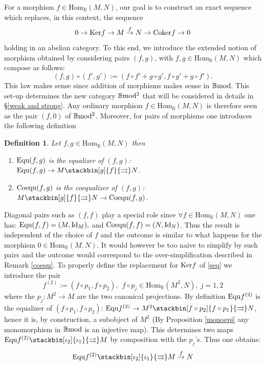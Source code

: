 \documentclass[12pt]{article}
\newtheorem{defn}[thm]{Definition}
\def\Hom{{\rm Hom}}
\def\id{{\rm id}}
\def\Ker{{\rm Ker}}
\def\equ{{\rm Equ}}
\def\coker{{\rm Coker}}
\def\coequ{{\rm Coequ}}
\def\B{{\mathbb B}}
\def\id{{\mbox{Id}}}
\def\Hom {{\mbox{Hom}}}
\def\bmod{{\rm \B mod}}
\def\bm2{{\rm \B mod^2}}
\begin{document}
For a morphism $f\in \Hom_\B(M,N)$, our goal is to construct an exact sequence which replaces, in this context, the sequence 
\begin{equation}\label{seq}
0\to \Ker f\to M\stackrel{f}{\to} N\to \coker f\to 0
\end{equation}
holding in an abelian category. To this end, we introduce the extended notion of morphism obtained by considering pairs $(f,g)$, with $f,g\in \Hom_\B(M,N)$ which compose 
as follows:
\begin{equation}\label{paircomp}
	(f,g)\circ (f',g'):=(f\circ f'+g\circ g', f\circ g'+g\circ f').
\end{equation}
This law makes sense since addition of morphisms makes sense in $\bmod$. This set-up determines the new category $\bm2$ that will be considered in details in \S\ref{weak and strong}. Any ordinary morphism $f\in \Hom_\B(M,N)$ is therefore seen as the pair $(f,0)$ of $\bm2$. Moreover, for pairs of morphisms one introduces the following definition
\begin{defn}\label{paircomp1} Let $f,g\in \Hom_\B(M,N)$ then 
\begin{enumerate}
\item $\equ(f,g)$ is the equalizer of $(f,g)$: ~~$\equ(f,g)\to M\stackbin[g]{f}{\rightrightarrows} N$.
\item $\coequ(f,g)$ is the 	coequalizer of $(f,g)$:~~$M\stackbin[g]{f}{\rightrightarrows} N \to \coequ(f,g)$.
\end{enumerate}	
\end{defn}
Diagonal pairs such as $(f,f)$ play a special role since $\forall f\in \Hom_\B(M,N)$ one has: 
$
\equ(f,f)=(M,\id_M),$ and $\coequ(f,f)=(N,\id_N)
$.
Thus the result is independent of the choice of $f$ and the outcome is similar to what happens for the morphism $0\in\Hom_\B(M,N)$.
It would however be too naive to simplify by such pairs and the outcome would correspond to the over-simplification described in Remark \ref{coequ}.
 To properly define the replacement for $\Ker f$ of \eqref{seq} we introduce the pair 
$$
f^{(2)}:=(f\circ p_1,f\circ p_2), \  \  f\circ p_j\in \Hom_\B(M^2,N),~j=1,2
$$
where the $p_j:M^2\to M$ are the two canonical projections. By definition $\equ f^{(2)}$ is the equalizer of $(f\circ p_1,f\circ p_2)$: 
$
\equ f^{(2)} \to M^2 \stackbin[f\circ p_2]{f\circ p_1}{\rightrightarrows} N
$, hence it is, by construction, a subobject of $M^2$ (By Proposition \ref{monoepi} any monomorphism in $\bmod$ is an injective map). This determines two maps $\equ f^{(2)}\stackbin[\iota_2]{\iota_1}{\rightrightarrows} M$ by composition with the $p_j$'s. Thus one obtains: \begin{equation}\label{defnker}
	 \equ f^{(2)} \stackbin[\iota_2]{\iota_1}{\rightrightarrows} M\stackrel{f}{\to} N
\end{equation}
\end{document}
